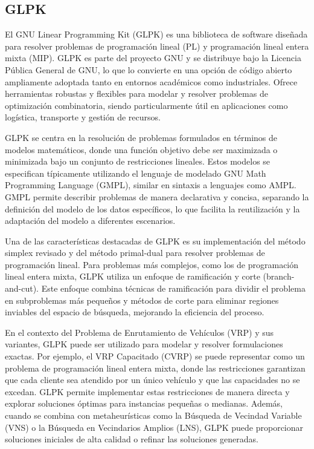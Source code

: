 \documentclass{article}
\begin{document}
\subsection{GLPK}
El GNU Linear Programming Kit (GLPK) es una biblioteca de software diseñada para resolver problemas de programación lineal (PL) y programación lineal entera mixta (MIP). GLPK es parte del proyecto GNU y se distribuye bajo la Licencia Pública General de GNU, lo que lo convierte en una opción de código abierto ampliamente adoptada tanto en entornos académicos como industriales. Ofrece herramientas robustas y flexibles para modelar y resolver problemas de optimización combinatoria, siendo particularmente útil en aplicaciones como logística, transporte y gestión de recursos.

GLPK se centra en la resolución de problemas formulados en términos de modelos matemáticos, donde una función objetivo debe ser maximizada o minimizada bajo un conjunto de restricciones lineales. Estos modelos se especifican típicamente utilizando el lenguaje de modelado GNU Math Programming Language (GMPL), similar en sintaxis a lenguajes como AMPL. GMPL permite describir problemas de manera declarativa y concisa, separando la definición del modelo de los datos específicos, lo que facilita la reutilización y la adaptación del modelo a diferentes escenarios.

Una de las características destacadas de GLPK es su implementación del método simplex revisado y del método primal-dual para resolver problemas de programación lineal. Para problemas más complejos, como los de programación lineal entera mixta, GLPK utiliza un enfoque de ramificación y corte (branch-and-cut). Este enfoque combina técnicas de ramificación para dividir el problema en subproblemas más pequeños y métodos de corte para eliminar regiones inviables del espacio de búsqueda, mejorando la eficiencia del proceso.

En el contexto del Problema de Enrutamiento de Vehículos (VRP) y sus variantes, GLPK puede ser utilizado para modelar y resolver formulaciones exactas. Por ejemplo, el VRP Capacitado (CVRP) se puede representar como un problema de programación lineal entera mixta, donde las restricciones garantizan que cada cliente sea atendido por un único vehículo y que las capacidades no se excedan. GLPK permite implementar estas restricciones de manera directa y explorar soluciones óptimas para instancias pequeñas o medianas. Además, cuando se combina con metaheurísticas como la Búsqueda de Vecindad Variable (VNS) o la Búsqueda en Vecindarios Amplios (LNS), GLPK puede proporcionar soluciones iniciales de alta calidad o refinar las soluciones generadas.
\end{document}
